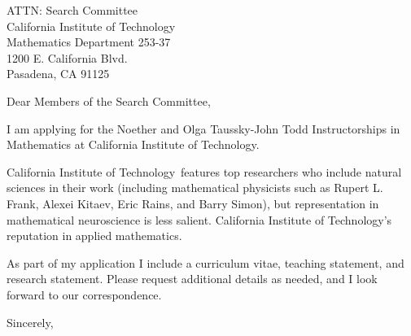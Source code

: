 \documentclass[11pt,a4paper]{letter}
\begin{document}

\def\School{California Institute of Technology}

\begin{letter}
{ATTN: Search Committee\\
California Institute of Technology\\
Mathematics Department 253-37\\
1200 E. California Blvd.\\
Pasadena, CA 91125}


\opening{Dear Members of the Search Committee,}

I am applying for the Noether and Olga Taussky-John Todd Instructorships in Mathematics at \School. 



\School~features top researchers who include natural sciences in their work (including mathematical physicists such as Rupert L. Frank, Alexei Kitaev, Eric Rains, and Barry Simon), but representation in mathematical neuroscience is less salient. \School's reputation in applied mathematics.



As part of my application I include a curriculum vitae, teaching statement, and research statement. Please request additional details as needed, and I look forward to our correspondence.

\closing{Sincerely,}
\end{letter}
\end{document}
